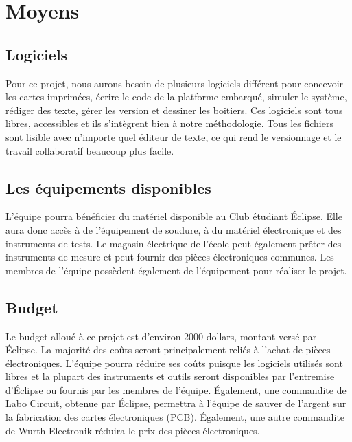 \section{Moyens}

\subsection{Logiciels}
Pour ce projet, nous aurons besoin de plusieurs logiciels différent pour concevoir les cartes imprimées, écrire le code de la platforme embarqué, simuler le système, rédiger des texte, gérer les version et dessiner les boitiers. Ces logiciels sont tous libres, accessibles et ils s'intègrent bien à notre méthodologie. Tous les fichiers sont lisible avec n'importe quel éditeur de texte, ce qui rend le versionnage et le travail collaboratif beaucoup plus facile.\\

\subsection{Les équipements disponibles}
L'équipe pourra bénéficier du matériel disponible au Club étudiant Éclipse. Elle aura donc accès à de l'équipement de soudure, à du matériel électronique et des instruments de tests. Le magasin électrique de l'école peut également prêter des instruments de mesure et peut fournir des pièces électroniques communes. Les membres de l'équipe possèdent également de l'équipement pour réaliser le projet.

\subsection{Budget}
Le budget alloué à ce projet est d'environ 2000 dollars, montant versé par Éclipse. La majorité des coûts seront principalement reliés à l'achat de pièces électroniques. L'équipe pourra réduire ses coûts puisque les logiciels utilisés sont libres et la plupart des instruments et outils seront disponibles par l'entremise d'Éclipse ou fournis par les membres de l'équipe. Également, une commandite de Labo Circuit, obtenue par Éclipse, permettra à l'équipe de sauver de l'argent sur la fabrication des cartes électroniques (PCB). Également, une autre commandite de Wurth Electronik réduira le prix des pièces électroniques.